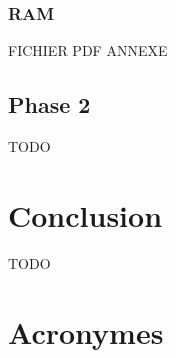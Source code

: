 \documentclass[12pt,a4paper]{article}
\begin{document}
\subsubsection{RAM}

FICHIER PDF ANNEXE

\subsection{Phase 2}

TODO 

\section{Conclusion}

TODO

\newpage
\section*{Acronymes}

\begin{acronym}
\end{acronym}
\end{document}
